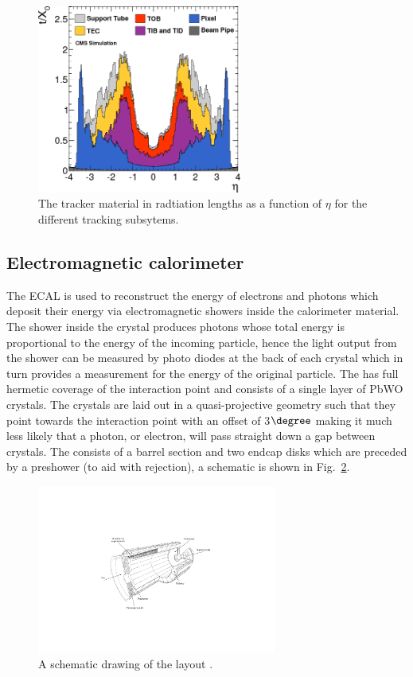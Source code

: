 \begin{figure}
  \includegraphics[width=0.6\textwidth]{ch2_cms_exp/plots/tracker_material.png}
  \caption[CMS tracker material budget]{The \CMS tracker material in radtiation lengths as a function of $\eta$ for the different tracking subsytems.}
  \label{fig:tracker_material}
\end{figure}

\subsection{Electromagnetic calorimeter}

The \acf{ECAL} is used to reconstruct the energy of electrons and photons which deposit their energy via electromagnetic showers inside the calorimeter material. The shower inside the crystal produces photons whose total energy is proportional to the energy of the incoming particle, hence the light output from the shower can be measured by photo diodes at the back of each crystal which in turn provides a measurement for the energy of the original particle. The \ECAL has full hermetic coverage of the interaction point and consists of a single layer of \acf{PbWO} crystals. The crystals are laid out in a quasi-projective geometry such that they point towards the interaction point with an offset of 3$\degree$ making it much less likely that a photon, or electron, will pass straight down a gap between crystals. The \ECAL consists of a barrel section and two endcap disks which are preceded by a preshower (to aid with \pizero rejection), a schematic is shown in Fig.~\ref{fig:cms_ecal}.

\begin{figure}
  \includegraphics[width=0.7\textwidth]{ch2_cms_exp/plots/cmsecal.pdf}
  \caption[CMS ECAL schematic]{A schematic drawing of the \CMS \ECAL layout .}
  \label{fig:cms_ecal}
\end{figure}

